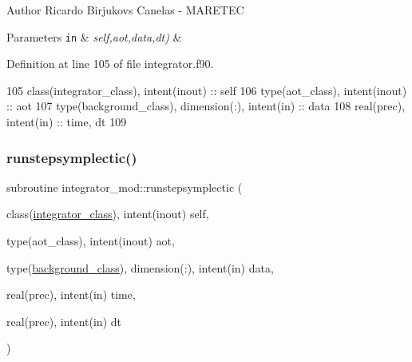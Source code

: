 \begin{DoxyAuthor}{Author}
Ricardo Birjukovs Canelas -\/ M\+A\+R\+E\+T\+EC 
\end{DoxyAuthor}

\begin{DoxyParams}[1]{Parameters}
\mbox{\tt in}  & {\em self,aot,data,dt)} & \\
\hline
\end{DoxyParams}


Definition at line 105 of file integrator.\+f90.


\begin{DoxyCode}
105     \textcolor{keywordtype}{class}(integrator\_class), \textcolor{keywordtype}{intent(inout)} :: self
106     \textcolor{keywordtype}{type}(aot\_class), \textcolor{keywordtype}{intent(inout)} :: aot
107     \textcolor{keywordtype}{type}(background\_class), \textcolor{keywordtype}{dimension(:)}, \textcolor{keywordtype}{intent(in)} :: data
108     \textcolor{keywordtype}{real(prec)}, \textcolor{keywordtype}{intent(in)} :: time, dt
109                 
\end{DoxyCode}
\mbox{\label{namespaceintegrator__mod_aa867e98470b3ec97a666099e8258b6ef}} 
\subsubsection{\texorpdfstring{runstepsymplectic()}{runstepsymplectic()}}
{\footnotesize\ttfamily subroutine integrator\+\_\+mod\+::runstepsymplectic (\begin{DoxyParamCaption}\item[{class(\mbox{\hyperlink{structintegrator__mod_1_1integrator__class}{integrator\+\_\+class}}), intent(inout)}]{self,  }\item[{type(aot\+\_\+class), intent(inout)}]{aot,  }\item[{type(\mbox{\hyperlink{structbackground__mod_1_1background__class}{background\+\_\+class}}), dimension(\+:), intent(in)}]{data,  }\item[{real(prec), intent(in)}]{time,  }\item[{real(prec), intent(in)}]{dt }\end{DoxyParamCaption})\hspace{0.3cm}{\ttfamily [private]}}



